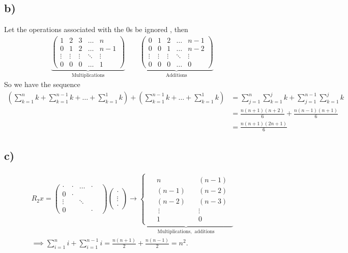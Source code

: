 \documentclass[12pt]{article}
\theoremstyle{definition}
\theoremstyle{definition}
\theoremstyle{definition}
\theoremstyle{definition}
\theoremstyle{definition}
\theoremstyle{example}
\theoremstyle{note}
\theoremstyle{remark}
\theoremstyle{example}
\begin{document}
			\subsection*{b) }
				Let the operations associated with the $0$s be ignored , then 
				\begin{gather*} \underbrace{\begin{pmatrix}
					1 & 2 & 3 & \dots & n \\
					0 & 1 & 2 & \dots & n-1 \\
					\vdots &\vdots & \vdots & \ddots & \vdots \\
					0 & 0 & 0 & \dots & 1
				\end{pmatrix}}_{\text{Multiplications}} \qquad 
					\underbrace{\begin{pmatrix}
						0 & 1 & 2 & \dots & n-1 \\
						0 & 0 & 1 & \dots & n-2 \\
						\vdots & \vdots & \vdots & \ddots & \vdots \\
						0 & 0 & 0 & \dots & 0
					\end{pmatrix}}_{\text{Additions}}
				\end{gather*}
				So we have the sequence
				\begin{align*}
					\left(\sum_{k=1}^{n} k + \sum_{k=1}^{n-1} k + \dots + \sum_{k=1}^{1} k\right) + \left(\sum_{k=1}^{n-1} k + \dots + \sum_{k=1}^{1} k\right) &= \sum_{j=1}^{n}\sum_{k=1}^{j} k + \sum_{j=1}^{n-1}\sum_{k=1}^{j} k  	 \\
					&= \frac{n(n+1)(n+2)}{6} + \frac{n(n-1)(n+1)}{6} \\
					&= \frac{n(n+1)(2n+1)}{6}
				\end{align*}	
			\subsection*{c) }
				\begin{gather*} R_{2}x = \begin{pmatrix}
					\cdot & \cdot & \dots  & \cdot \\
					0 & \cdot &  & & \\
					\vdots &  & \ddots & \\
					0 & & &    \cdot
				\end{pmatrix} \begin{pmatrix}
					\cdot \\ \vdots \\ \cdot
				\end{pmatrix} \longrightarrow \underbrace{\begin{cases}
					\begin{aligned}
					&n \quad &(n-1) \\
					&(n-1) \quad &(n-2) \\
					&(n-2) \quad &(n-3) \\
					& \ \vdots  \quad &\vdots  \\
					&1 \quad &0 
					\end{aligned}
				\end{cases}}_{\text{Multiplications, } \ \text{additions}} \\
			\implies \sum_{i=1}^{n} i + \sum_{i=1}^{n-1} i = \frac{n(n+1)}{2} + \frac{n(n-1)}{2} = n^{2}.
			\end{gather*}
\end{document}
